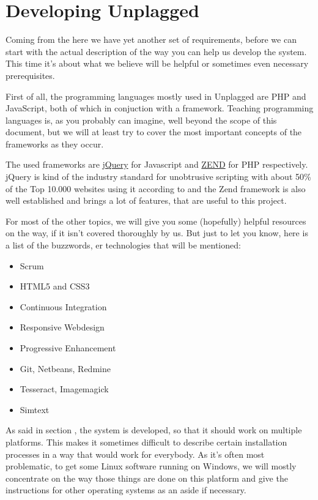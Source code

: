 \chapter{Developing Unplagged}\label{chap:developingUnplagged}

Coming from the  here we have yet another set of requirements, before we can
start with the actual description of the way you can help us develop the system. This time it's 
about what we believe will be helpful or sometimes even necessary prerequisites. 

First of all, the programming languages mostly used in Unplagged are PHP and JavaScript, both of which in conjuction
with a framework. Teaching programming languages is, as you probably can imagine, well beyond the scope of this document,
but we will at least try to cover the most important concepts of the frameworks as they occur. 

The used frameworks are 
\href{http://jquery.com/}{jQuery} for Javascript and \href{http://framework.zend.com/docs/overview}{ZEND} for PHP 
respectively. jQuery is kind of the industry standard for unobtrusive scripting with about 50\% 
of the Top 10.000 websites using it according to \citet{Trends} and the Zend framework is also well established and
brings a lot of features, that are useful to this project.

For most of the other topics, we will give you some (hopefully) helpful resources on the way, if it isn't covered 
thoroughly by us. But just to let you
know, here is a list of the buzzwords, er technologies that will be mentioned:

\begin{itemize}
\item Scrum
\item HTML5 and CSS3
\item Continuous Integration
\item Responsive Webdesign
\item Progressive Enhancement
\item Git, Netbeans, Redmine
\item Tesseract, Imagemagick
\item Simtext
\end{itemize}

As said in section , the system is developed, so that it should work on multiple platforms. 
This makes it sometimes difficult to describe certain installation processes in a way that would work for everybody. As
it's often most problematic, to get some Linux software running on Windows, we will mostly concentrate on the way those
things are done on this platform and give the instructions for other operating systems as an aside if necessary.

